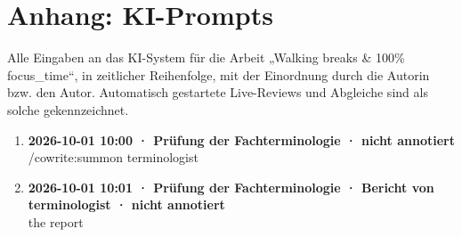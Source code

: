 \section*{Anhang: KI-Prompts}

Alle Eingaben an das KI-System für die Arbeit „Walking breaks \& 100\% focus\_time“, in zeitlicher Reihenfolge, mit der Einordnung durch die Autorin bzw. den Autor. Automatisch gestartete Live-Reviews und Abgleiche sind als solche gekennzeichnet.

\begin{enumerate}
  \item \textbf{2026-10-01 10:00 · Prüfung der Fachterminologie · nicht annotiert} \\
  /cowrite:summon terminologist
  \item \textbf{2026-10-01 10:01 · Prüfung der Fachterminologie · Bericht von terminologist · nicht annotiert} \\
  the report
\end{enumerate}
